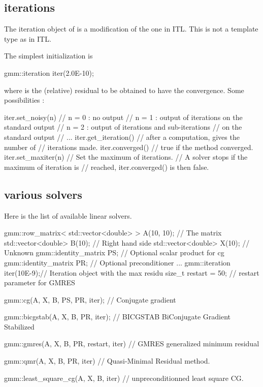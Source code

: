 \documentclass[11pt,a4paper]{article}
\begin{document}
\subsection{iterations}
  The iteration object of \gmm is a modification of the one in ITL. This is not a template type as in ITL. 

The simplest initialization is
\begin{cppcode}
  gmm::iteration iter(2.0E-10);
\end{cppcode}
where  is the (relative) residual to be obtained to have the convergence.
Some possibilities :
\begin{cppcode}
  iter.set_noisy(n) // n = 0 : no output
                    // n = 1 : output of iterations on the standard output
                    // n = 2 : output of iterations and sub-iterations 
                    //         on the standard output
                    // ...
  iter.get_iteration() // after a computation, gives the number of
                       // iterations made.
  iter.converged()     // true if the method converged.
  iter.set_maxiter(n)  // Set the maximum of iterations.
                       // A solver stops if the maximum of iteration is 
                       // reached, iter.converged() is then false.
\end{cppcode}

\subsection{various solvers}
Here is the list of available linear solvers.
\begin{cppcode}
  gmm::row_matrix< std::vector<double> > A(10, 10);  // The matrix
  std::vector<double> B(10); // Right hand side
  std::vector<double> X(10); // Unknown
  gmm::identity_matrix PS;   // Optional scalar product for cg
  gmm::identity_matrix PR;   // Optional preconditioner
  ...
  gmm::iteration iter(10E-9);// Iteration object with the max residu
  size_t restart = 50;       // restart parameter for GMRES
  
  gmm::cg(A, X, B, PS, PR, iter); // Conjugate gradient

  gmm::bicgstab(A, X, B, PR, iter); // BICGSTAB BiConjugate Gradient Stabilized

  gmm::gmres(A, X, B, PR, restart, iter) // GMRES generalized minimum residual

  gmm::qmr(A, X, B, PR, iter) // Quasi-Minimal Residual method.

  gmm::least_square_cg(A, X, B, iter) // unpreconditionned least square CG.
\end{cppcode}
\end{document}
